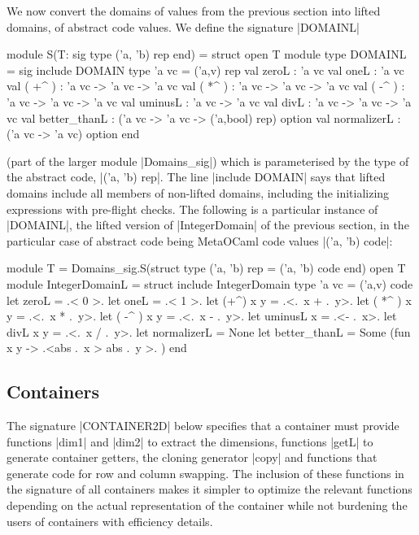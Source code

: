 \documentclass[draft]{elsart}
\begin{document}
We now convert the domains of values from the previous section into
lifted domains, of abstract code values. We define the signature
|DOMAINL| 
\begin{code}
module S(T: sig type ('a, 'b) rep  end) = struct
open T
module type DOMAINL = sig
  include DOMAIN
  type 'a vc = ('a,v) rep
  val zeroL : 'a vc
  val oneL : 'a vc
  val ( +^ ) : 'a vc -> 'a vc -> 'a vc
  val ( *^ ) : 'a vc -> 'a vc -> 'a vc
  val ( -^ ) : 'a vc -> 'a vc -> 'a vc
  val uminusL : 'a vc -> 'a vc
  val divL : 'a vc -> 'a vc -> 'a vc
  val better_thanL : ('a vc -> 'a vc -> ('a,bool) rep) option
  val normalizerL : ('a vc -> 'a vc) option
end 
\end{code}
(part of the larger module |Domains_sig|) which is parameterised by
the type of the abstract code, |('a, 'b) rep|. The line |include DOMAIN|
says that lifted domains include all members of non-lifted domains,
including the initializing expressions with pre-flight checks.
The following is a particular instance of |DOMAINL|, the lifted
version of |IntegerDomain| of the previous section, in the particular
case of abstract code being MetaOCaml code values |('a, 'b) code|:
\begin{code}
module T = Domains_sig.S(struct type ('a, 'b) rep = ('a, 'b) code end)
open T
module IntegerDomainL = struct
    include IntegerDomain
    type 'a vc = ('a,v) code
    let zeroL = .< 0 >.  
    let oneL = .< 1 >. 
    let (+^) x y = .<.~x + .~y>. 
    let ( *^ ) x y = .<.~x * .~y>.
    let ( -^ ) x y = .<.~x - .~y>.
    let uminusL x = .<- .~x>.
    let divL x y = .<.~x / .~y>. 
    let normalizerL = None
    let better_thanL = Some (fun x y -> .<abs .~x > abs .~y >. )
end
\end{code}


\subsection{Containers}

The signature |CONTAINER2D| below specifies that a container must provide
functions |dim1| and |dim2| to extract the dimensions, functions |getL|
to generate container getters, the cloning
generator |copy| and functions that generate code for row and column
swapping. The inclusion of these functions in the signature of all
containers makes it simpler to optimize the relevant functions
depending on the actual representation of the container while not
burdening the users of containers with efficiency details.
\end{document}
